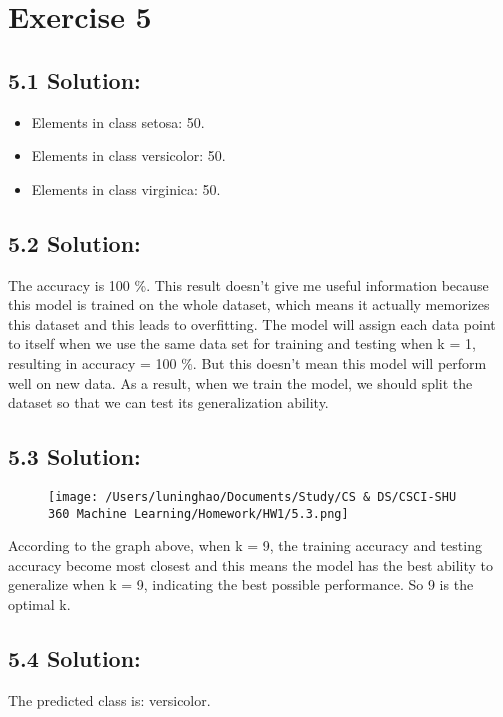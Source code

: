 \documentclass{article}
\begin{document}
\newpage
\section*{Exercise 5}
\subsection*{5.1 Solution:}
\begin{itemize}
    \item Elements in class setosa: 50.
    \item Elements in class versicolor: 50.
    \item Elements in class virginica: 50.
\end{itemize}

\subsection*{5.2 Solution:}
The accuracy is 100 \%. This result doesn't give me useful information because this model is trained on the whole dataset, which means it actually memorizes this dataset and this leads to overfitting. The model will assign each 
data point to itself when we use the same data set for training and testing when k = 1, resulting in accuracy = 100 \%. But this doesn't mean this model will perform well on new data. As a result, when we train the model, we should split the dataset so that we can test its generalization ability.

\subsection*{5.3 Solution:}
\begin{figure}[h]
    \centering
    \texttt{[image: /Users/luninghao/Documents/Study/CS \& DS/CSCI-SHU 360 Machine Learning/Homework/HW1/5.3.png]}
\end{figure}
According to the graph above, when k = 9, the training accuracy and testing accuracy become most closest and this means the model has the best ability to generalize when k = 9, indicating the best possible performance.  So 9 is the optimal k. 

\subsection*{5.4 Solution:}
The predicted class is: versicolor.
\end{document}
